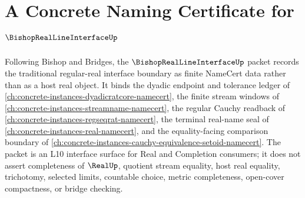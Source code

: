 \chapter{A Concrete Naming Certificate for $\BishopRealLineInterfaceUp$}
\label{ch:concrete-instances-bishop-real-line-interface-namecert}

Following Bishop and Bridges, the $\BishopRealLineInterfaceUp$ packet records the traditional regular-real interface boundary as finite NameCert data rather than as a host real object. It binds the dyadic endpoint and tolerance ledger of \autoref{ch:concrete-instances-dyadicratcore-namecert}, the finite stream windows of \autoref{ch:concrete-instances-streamname-namecert}, the regular Cauchy readback of \autoref{ch:concrete-instances-regseqrat-namecert}, the terminal real-name seal of \autoref{ch:concrete-instances-real-namecert}, and the equality-facing comparison boundary of \autoref{ch:concrete-instances-cauchy-equivalence-setoid-namecert}. The packet is an L10 interface surface for Real and Completion consumers; it does not assert completeness of $\RealUp$, quotient stream equality, host real equality, trichotomy, selected limits, countable choice, metric completeness, open-cover compactness, or bridge checking.

